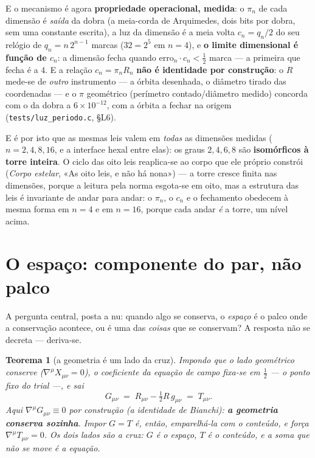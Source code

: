 \documentclass[11pt,a4paper]{article}
\newcommand{\code}[1]{\texttt{\small #1}}
\newtheorem{teorema}{Teorema}
\begin{document}
\smallskip
\noindent E o mecanismo é agora \textbf{propriedade operacional, medida}: o $\pi_n$ de cada
dimensão é \emph{saída} da dobra (a meia-corda de Arquimedes, dois bits por dobra, sem uma
constante escrita), a luz da dimensão é a meia volta $c_n=q_n/2$ do seu relógio de
$q_n=n\,2^{n-1}$ marcas ($32=2^5$ em $n=4$), e \textbf{o limite dimensional é função de $c_n$}:
a dimensão fecha quando $\mathrm{erro}_n\cdot c_n<\tfrac12$ marca --- a primeira que fecha é a
$4$. E a relação $c_n=\pi_n R_n$ \textbf{não é identidade por construção}: o $R$ mede-se de
\emph{outro} instrumento --- a órbita desenhada, o diâmetro tirado das coordenadas --- e o $\pi$
geométrico (perímetro contado/diâmetro medido) concorda com o da dobra a $6\times10^{-12}$, com a
órbita a fechar na origem (\code{tests/luz\_periodo.c}, §L6).

\smallskip
\noindent E é por isto que as mesmas leis valem em \emph{todas} as dimensões medidas
($n=2,4,8,16$, e a interface hexal entre elas): os graus $2,4,6,8$ são
\textbf{isomórficos à torre inteira}. O ciclo das oito leis reaplica-se ao corpo que ele
próprio constrói (\emph{Corpo estelar}, «As oito leis, e não há nona») --- a torre cresce
finita nas dimensões, porque a leitura pela norma esgota-se em oito, mas a estrutura das
leis é invariante de andar para andar: o $\pi_n$, o $c_n$ e o fechamento obedecem à mesma
forma em $n=4$ e em $n=16$, porque cada andar \emph{é} a torre, um nível acima.

\section{O espaço: componente do par, não palco}\label{sec:espaco}

A pergunta central, posta a nu: quando algo se conserva, o \emph{espaço} é o palco onde a conservação
acontece, ou é uma das \emph{coisas} que se conservam? A resposta não se decreta --- deriva-se.

\begin{teorema}[a geometria é um lado da cruz]\label{thm:espaco}
Impondo que o lado geométrico conserve ($\nabla^{\mu}X_{\mu\nu}=0$), o coeficiente da equação de campo
fixa-se em $\tfrac12$ --- o ponto fixo do trial ---, e sai
\[
  G_{\mu\nu}\;=\;R_{\mu\nu}-\tfrac12R\,g_{\mu\nu}\;=\;T_{\mu\nu}.
\]
Aqui $\nabla^{\mu}G_{\mu\nu}\equiv0$ por construção (a identidade de Bianchi): \textbf{a geometria conserva
sozinha}. Impor $G=T$ é, então, \emph{emparelhá-la} com o conteúdo, e força $\nabla^{\mu}T_{\mu\nu}=0$. Os
dois lados são a cruz: $G$ é o espaço, $T$ é o conteúdo, e a soma que não se move é a equação.
\end{teorema}
\end{document}
